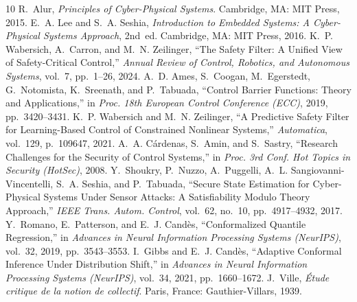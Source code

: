 \documentclass[conference]{IEEEtran}
\begin{document}
\begin{thebibliography}{10}
R.~Alur, \emph{Principles of Cyber-Physical Systems}. Cambridge, MA: MIT Press, 2015.
E.~A. Lee and S.~A. Seshia, \emph{Introduction to Embedded Systems: A Cyber-Physical Systems Approach}, 2nd~ed. Cambridge, MA: MIT Press, 2016.
K.~P. Wabersich, A.~Carron, and M.~N. Zeilinger, ``The Safety Filter: A Unified View of Safety-Critical Control,'' \emph{Annual Review of Control, Robotics, and Autonomous Systems}, vol.~7, pp.~1--26, 2024.
A.~D. Ames, S.~Coogan, M.~Egerstedt, G.~Notomista, K.~Sreenath, and P.~Tabuada, ``Control Barrier Functions: Theory and Applications,'' in \emph{Proc. 18th European Control Conference (ECC)}, 2019, pp.~3420--3431.
K.~P. Wabersich and M.~N. Zeilinger, ``A Predictive Safety Filter for Learning-Based Control of Constrained Nonlinear Systems,'' \emph{Automatica}, vol.~129, p.~109647, 2021.
A.~A. C{\'a}rdenas, S.~Amin, and S.~Sastry, ``Research Challenges for the Security of Control Systems,'' in \emph{Proc. 3rd Conf. Hot Topics in Security (HotSec)}, 2008.
Y.~Shoukry, P.~Nuzzo, A.~Puggelli, A.~L. Sangiovanni-Vincentelli, S.~A. Seshia, and P.~Tabuada, ``Secure State Estimation for Cyber-Physical Systems Under Sensor Attacks: A Satisfiability Modulo Theory Approach,'' \emph{IEEE Trans. Autom. Control}, vol.~62, no.~10, pp.~4917--4932, 2017.
Y.~Romano, E.~Patterson, and E.~J. Cand\`es, ``Conformalized Quantile Regression,'' in \emph{Advances in Neural Information Processing Systems (NeurIPS)}, vol.~32, 2019, pp.~3543--3553.
I.~Gibbs and E.~J. Cand\`es, ``Adaptive Conformal Inference Under Distribution Shift,'' in \emph{Advances in Neural Information Processing Systems (NeurIPS)}, vol.~34, 2021, pp.~1660--1672.
J.~Ville, \emph{\'Etude critique de la notion de collectif}. Paris, France: Gauthier-Villars, 1939.
\end{thebibliography}
\end{document}
